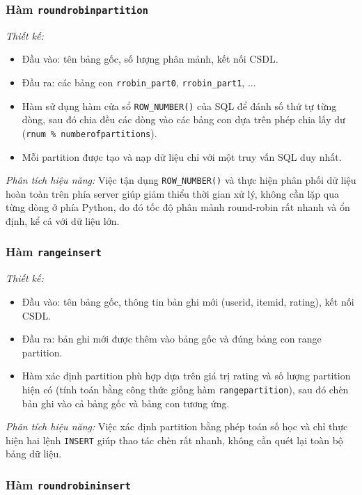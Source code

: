 \documentclass[a4paper]{article}
\begin{document}
\subsubsection{Hàm \texttt{roundrobinpartition}}

\textit{Thiết kế:}
\begin{itemize}
    \item Đầu vào: tên bảng gốc, số lượng phân mảnh, kết nối CSDL.
    \item Đầu ra: các bảng con \texttt{rrobin\_part0}, \texttt{rrobin\_part1}, ...
    \item Hàm sử dụng hàm cửa sổ \texttt{ROW\_NUMBER()} của SQL để đánh số thứ tự từng dòng, sau đó chia đều các dòng vào các bảng con dựa trên phép chia lấy dư (\texttt{rnum \% numberofpartitions}).
    \item Mỗi partition được tạo và nạp dữ liệu chỉ với một truy vấn SQL duy nhất.
\end{itemize}
\textit{Phân tích hiệu năng:}  
Việc tận dụng \texttt{ROW\_NUMBER()} và thực hiện phân phối dữ liệu hoàn toàn trên phía server giúp giảm thiểu thời gian xử lý, không cần lặp qua từng dòng ở phía Python, do đó tốc độ phân mảnh round-robin rất nhanh và ổn định, kể cả với dữ liệu lớn.

\subsubsection{Hàm \texttt{rangeinsert}}

\textit{Thiết kế:}
\begin{itemize}
    \item Đầu vào: tên bảng gốc, thông tin bản ghi mới (userid, itemid, rating), kết nối CSDL.
    \item Đầu ra: bản ghi mới được thêm vào bảng gốc và đúng bảng con range partition.
    \item Hàm xác định partition phù hợp dựa trên giá trị rating và số lượng partition hiện có (tính toán bằng công thức giống hàm \texttt{rangepartition}), sau đó chèn bản ghi vào cả bảng gốc và bảng con tương ứng.
\end{itemize}
\textit{Phân tích hiệu năng:}  
Việc xác định partition bằng phép toán số học và chỉ thực hiện hai lệnh \texttt{INSERT} giúp thao tác chèn rất nhanh, không cần quét lại toàn bộ bảng dữ liệu.

\subsubsection{Hàm \texttt{roundrobininsert}}
\end{document}
